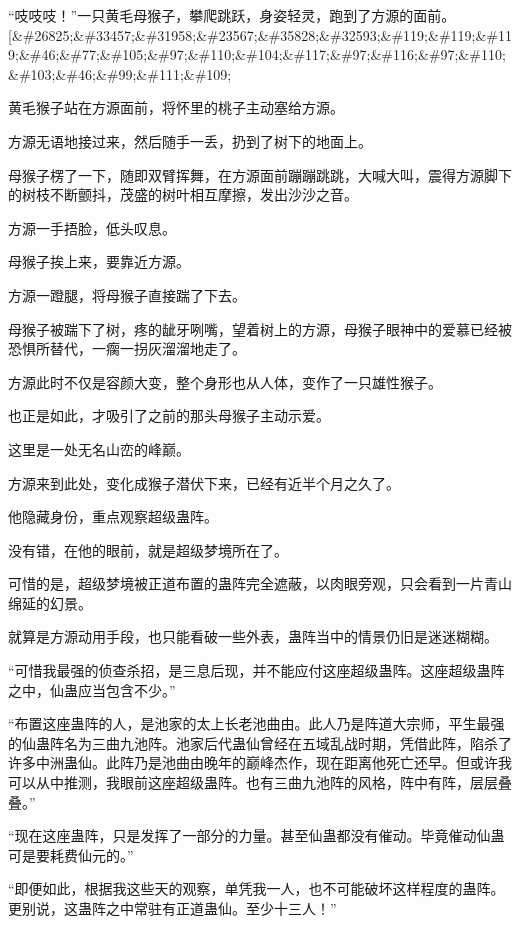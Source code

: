
\begin{this_body}

“吱吱吱！”一只黄毛母猴子，攀爬跳跃，身姿轻灵，跑到了方源的面前。[\&\#26825;\&\#33457;\&\#31958;\&\#23567;\&\#35828;\&\#32593;\&\#119;\&\#119;\&\#119;\&\#46;\&\#77;\&\#105;\&\#97;\&\#110;\&\#104;\&\#117;\&\#97;\&\#116;\&\#97;\&\#110;\&\#103;\&\#46;\&\#99;\&\#111;\&\#109;

黄毛猴子站在方源面前，将怀里的桃子主动塞给方源。

方源无语地接过来，然后随手一丢，扔到了树下的地面上。

母猴子楞了一下，随即双臂挥舞，在方源面前蹦蹦跳跳，大喊大叫，震得方源脚下的树枝不断颤抖，茂盛的树叶相互摩擦，发出沙沙之音。

方源一手捂脸，低头叹息。

母猴子挨上来，要靠近方源。

方源一蹬腿，将母猴子直接踹了下去。

母猴子被踹下了树，疼的龇牙咧嘴，望着树上的方源，母猴子眼神中的爱慕已经被恐惧所替代，一瘸一拐灰溜溜地走了。

方源此时不仅是容颜大变，整个身形也从人体，变作了一只雄性猴子。

也正是如此，才吸引了之前的那头母猴子主动示爱。

这里是一处无名山峦的峰巅。

方源来到此处，变化成猴子潜伏下来，已经有近半个月之久了。

他隐藏身份，重点观察超级蛊阵。

没有错，在他的眼前，就是超级梦境所在了。

可惜的是，超级梦境被正道布置的蛊阵完全遮蔽，以肉眼旁观，只会看到一片青山绵延的幻景。

就算是方源动用手段，也只能看破一些外表，蛊阵当中的情景仍旧是迷迷糊糊。

“可惜我最强的侦查杀招，是三息后现，并不能应付这座超级蛊阵。这座超级蛊阵之中，仙蛊应当包含不少。”

“布置这座蛊阵的人，是池家的太上长老池曲由。此人乃是阵道大宗师，平生最强的仙蛊阵名为三曲九池阵。池家后代蛊仙曾经在五域乱战时期，凭借此阵，陷杀了许多中洲蛊仙。此阵乃是池曲由晚年的巅峰杰作，现在距离他死亡还早。但或许我可以从中推测，我眼前这座超级蛊阵。也有三曲九池阵的风格，阵中有阵，层层叠叠。”

“现在这座蛊阵，只是发挥了一部分的力量。甚至仙蛊都没有催动。毕竟催动仙蛊可是要耗费仙元的。”

“即便如此，根据我这些天的观察，单凭我一人，也不可能破坏这样程度的蛊阵。更别说，这蛊阵之中常驻有正道蛊仙。至少十三人！”


\end{this_body}
